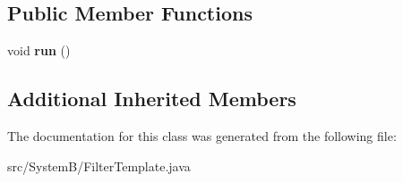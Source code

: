 \subsection*{Public Member Functions}
\begin{DoxyCompactItemize}
\item 
\hypertarget{class_system_b_1_1_filter_template_aa57659516c3df33e78bec87f25a879fa}{}void {\bfseries run} ()\label{class_system_b_1_1_filter_template_aa57659516c3df33e78bec87f25a879fa}

\end{DoxyCompactItemize}
\subsection*{Additional Inherited Members}


The documentation for this class was generated from the following file\+:\begin{DoxyCompactItemize}
\item 
src/\+System\+B/Filter\+Template.\+java\end{DoxyCompactItemize}
